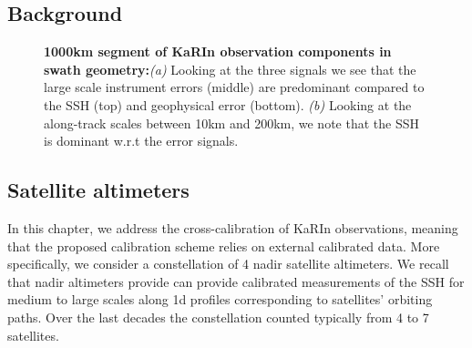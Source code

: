 \begin{bibunit}
\section{Background}
\label{c3sec:background}
\noindent
\begin{figure}[!t]%
   \centering
    \caption{\textbf{1000km segment of KaRIn observation components in swath geometry:}\textit{(a)} Looking at the three signals we see that the large scale instrument errors (middle) are predominant compared to the SSH (top) and geophysical error (bottom). \textit{(b)} Looking at the along-track scales between 10km and 200km, we note that the SSH is dominant w.r.t the error signals.}%
    \label{c3fig:filtered_swath_uncal_comp}%
\end{figure}
\subsection*{Satellite altimeters}
In this chapter, we address the cross-calibration of KaRIn observations, meaning that the proposed calibration scheme relies on external calibrated data. More specifically, we consider a constellation of  4 nadir satellite altimeters. We recall that nadir altimeters provide can provide calibrated measurements of the SSH for medium to large scales along 1{\sc d} profiles corresponding to satellites' orbiting paths. Over the last decades the constellation counted typically from 4 to 7 satellites.


\end{bibunit}
